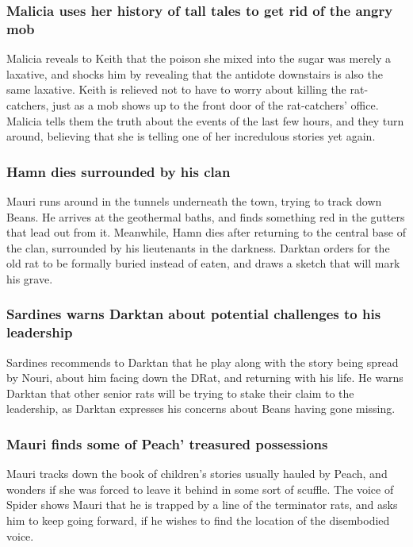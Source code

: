 \subsubsection{\Gls{Malicia} uses her history of tall tales to get rid of the angry mob}
\Gls{Malicia} reveals to \Gls{Keith} that the poison she mixed into the sugar was merely a laxative,
and shocks him by revealing that the antidote downstairs is also the same laxative. \Gls{Keith} is
relieved not to have to worry about killing the rat-catchers, just as a mob shows up to the front
door of the rat-catchers' office. \Gls{Malicia} tells them the truth about the events of the last
few hours, and they turn around, believing that she is telling one of her incredulous stories yet
again.

\subsubsection{\Gls{Hamn} dies surrounded by his clan}
\Gls{Mauri} runs around in the tunnels underneath the town, trying to track down \Gls{Beans}. He
arrives at the geothermal baths, and finds something red in the gutters that lead out from it.
Meanwhile, \Gls{Hamn} dies after returning to the central base of the clan, surrounded by his
lieutenants in the darkness. \Gls{Darktan} orders for the old rat to be formally buried instead of
eaten, and draws a sketch that will mark his grave.

\subsubsection{\Gls{Sardines} warns \Gls{Darktan} about potential challenges to his leadership}
\Gls{Sardines} recommends to \Gls{Darktan} that he play along with the story being spread by
\Gls{Nouri}, about him facing down the \Gls{DRat}, and returning with his life. He warns
\Gls{Darktan} that other senior rats will be trying to stake their claim to the leadership, as
\Gls{Darktan} expresses his concerns about \Gls{Beans} having gone missing.

\subsubsection{\Gls{Mauri} finds some of \Gls{Peach}' treasured possessions}
\Gls{Mauri} tracks down the book of children's stories usually hauled by \Gls{Peach}, and wonders
if she was forced to leave it behind in some sort of scuffle. The voice of \Gls{Spider} shows
\Gls{Mauri} that he is trapped by a line of the terminator rats, and asks him to keep going
forward, if he wishes to find the location of the disembodied voice.

